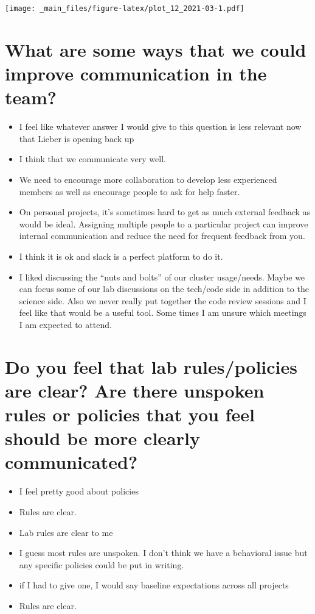 \documentclass[
]{book}
\providecommand{\tightlist}{%
  \setlength{\itemsep}{0pt}\setlength{\parskip}{0pt}}
\begin{document}
\texttt{[image: \_main\_files/figure-latex/plot\_12\_2021-03-1.pdf]}

\hypertarget{what-are-some-ways-that-we-could-improve-communication-in-the-team-1}{%
\section{What are some ways that we could improve communication in the team?}\label{what-are-some-ways-that-we-could-improve-communication-in-the-team-1}}

\begin{itemize}
\tightlist
\item
  I feel like whatever answer I would give to this question is less relevant now that Lieber is opening back up
\item
  I think that we communicate very well.
\item
  We need to encourage more collaboration to develop less experienced members as well as encourage people to ask for help faster.
\item
  On personal projects, it's sometimes hard to get as much external feedback as would be ideal. Assigning multiple people to a particular project can improve internal communication and reduce the need for frequent feedback from you.
\item
  I think it is ok and slack is a perfect platform to do it.
\item
  I liked discussing the ``nuts and bolts'' of our cluster usage/needs. Maybe we can focus some of our lab discussions on the tech/code side in addition to the science side. Also we never really put together the code review sessions and I feel like that would be a useful tool. Some times I am unsure which meetings I am expected to attend.
\end{itemize}

\hypertarget{do-you-feel-that-lab-rulespolicies-are-clear-are-there-unspoken-rules-or-policies-that-you-feel-should-be-more-clearly-communicated-1}{%
\section{Do you feel that lab rules/policies are clear? Are there unspoken rules or policies that you feel should be more clearly communicated?}\label{do-you-feel-that-lab-rulespolicies-are-clear-are-there-unspoken-rules-or-policies-that-you-feel-should-be-more-clearly-communicated-1}}

\begin{itemize}
\tightlist
\item
  I feel pretty good about policies
\item
  Rules are clear.
\item
  Lab rules are clear to me
\item
  I guess most rules are unspoken. I don't think we have a behavioral issue but any specific policies could be put in writing.
\item
  if I had to give one, I would say baseline expectations across all projects
\item
  Rules are clear.
\end{itemize}
\end{document}
